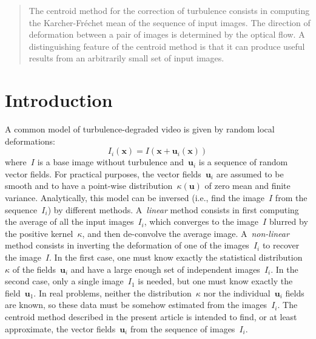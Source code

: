 \documentclass{ipol}
\def\x{\mathbf{x}}
\def\u{\mathbf{u}}
\begin{document}
\begin{abstract}
	The centroid method for the correction of turbulence consists in computing
	the Karcher-Fréchet mean of the sequence of input images.  The direction of
	deformation between a pair of images is determined by the optical flow.
	A distinguishing feature of the centroid method is that it can produce
	useful results from an arbitrarily small set of input images.
\end{abstract}

%
%
%
%

\section{Introduction}

A common model of turbulence-degraded video is given by random local
deformations:
\begin{equation}
	I_i(\x)=I(\x+\u_i(\x))
\end{equation}
where~$I$ is a base image without turbulence and~$\u_i$ is a sequence of
random vector fields.  For practical purposes, the vector fields~$\u_i$ are
assumed to be smooth and to have a point-wise distribution~$\kappa(\u)$ of
zero mean and finite variance.  Analytically, this model can be inversed
(i.e., find the image~$I$ from the sequence~$I_i$) by different methods.
A~\emph{linear} method consists in first computing the average of all the
input images~$I_i$, which converges to the image~$I$ blurred by the positive
kernel~$\kappa$, and then de-convolve the average image.  A~\emph{non-linear}
method consists in inverting the deformation of one of the images~$I_i$ to
recover the image~$I$.  In the first case, one must know exactly the
statistical distribution~$\kappa$ of the fields~$\u_i$ and have a large enough
set of independent images~$I_i$.  In the second case, only a single
image~$I_1$ is needed, but one must know exactly the field~$\u_1$.  In real
problems, neither the distribution~$\kappa$ nor the individual~$\u_i$ fields
are known, so these data must be somehow estimated from the images~$I_i$.  The
centroid method described in the present article is intended to find, or at
least approximate, the vector fields~$\u_i$ from the sequence of images~$I_i$.
\end{document}
